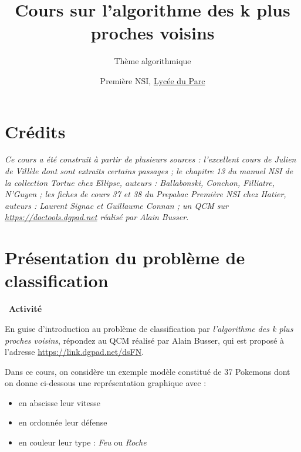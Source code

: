 \documentclass[
  11pt,
]{article}
\title{Cours sur l'algorithme des k plus proches voisins}
\subtitle{Thème algorithmique}
\author{Première NSI, \href{https://frederic-junier.org/}{Lycée du Parc}}
\date{}
\providecommand{\tightlist}{%
  \setlength{\itemsep}{0pt}\setlength{\parskip}{0pt}}
\newcounter{thme}
\newcounter{prop}
\newcounter{activite}
\newenvironment{activite}[1]
{\par \medskip   \noindent   \addtocounter{activite}{1}
\begin{bclogo}[arrondi =0.1,   noborder = true, logo=\bcvelo, marge=4]{~\textbf{Activité} \textbf{\theactivite} {\itshape #1} }  \par}
{
\end{bclogo}
 \par \bigskip }
\newcounter{cours}
\newcounter{alg}
\begin{document}
\maketitle

\renewcommand*\contentsname{Table des matières}
{
\hypersetup{linkcolor=}
\setcounter{tocdepth}{3}
\tableofcontents
}
\hypertarget{cruxe9dits}{%
\section*{Crédits}\label{cruxe9dits}}

\emph{Ce cours a été construit à partir de plusieurs sources :
l'excellent cours de Julien de Villèle dont sont extraits certains
passages ; le chapitre 13 du manuel NSI de la collection Tortue chez
Ellipse, auteurs : Ballabonski, Conchon, Filliatre, N'Guyen ; les fiches
de cours 37 et 38 du Prepabac Première NSI chez Hatier, auteurs :
Laurent Signac et Guillaume Connan ; un QCM sur
\url{https://doctools.dgpad.net} réalisé par Alain Busser.}

\hypertarget{pruxe9sentation-du-probluxe8me-de-classification}{%
\section{Présentation du problème de
classification}\label{pruxe9sentation-du-probluxe8me-de-classification}}

\begin{activite}{}

En guise d'introduction au problème de classification par
\emph{l'algorithme des k plus proches voisins}, répondez au QCM réalisé
par Alain Busser, qui est proposé à l'adresse
\url{https://link.dgpad.net/dsFN}.

\end{activite}

Dans ce cours, on considère un exemple modèle constitué de 37 Pokemons
dont on donne ci-dessous une représentation graphique avec :

\begin{itemize}
\tightlist
\item
  en abscisse leur vitesse
\item
  en ordonnée leur défense
\item
  en couleur leur type : \emph{Feu} ou \emph{Roche}
\end{itemize}
\end{document}
